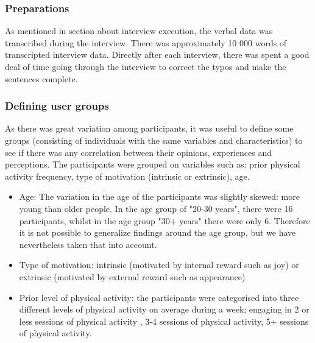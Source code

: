     
    \subsubsection{Preparations}
    As mentioned in section about interview execution, the verbal data was transcribed during the interview. There was approximately 10 000 words of transcripted interview data. 
    Directly after each interview, there was spent a good deal of time going through the interview to correct the typos and make the sentences complete. 

    \subsubsection{Defining user groups}
    As there was great variation among participants, it was useful to define some groups (consisting of individuals with the same variables and characteristics) to see if there was any correlation between their opinions, experiences and perceptions. The participants were grouped on variables such as: prior physical activity frequency, type of motivation (intrinsic or extrinsic), age.
    
    \begin{itemize}
    \item Age: The variation in the age of the participants was slightly skewed: more young than older people. In the age group of "20-30 years", there were 16 participants, whilst in the age group "30+ years" there were only 6. Therefore it is not possible to generalize findings around the age group, but we have nevertheless taken that into account.
    \item     Type of motivation: intrinsic (motivated by internal reward such as joy) or extrinsic (motivated by external reward such as appearance)
    \item     Prior level of physical activity: the participants were categorised into three different levels of physical activity on average during a week; engaging in 2 or less sessions of physical activity , 3-4 sessions of physical activity, 5+ sessions of physical activity. 
    \end{itemize}
    
